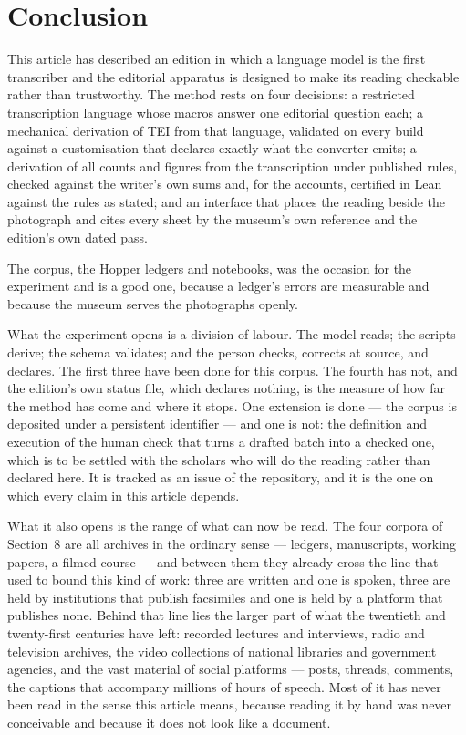 \documentclass[11pt]{article}
\begin{document}
\section{Conclusion}

This article has described an edition in which a language model is the first transcriber and the editorial apparatus is designed to make its reading checkable rather than trustworthy. The method rests on four decisions: a restricted transcription language whose macros answer one editorial question each; a mechanical derivation of TEI from that language, validated on every build against a customisation that declares exactly what the converter emits; a derivation of all counts and figures from the transcription under published rules, checked against the writer's own sums and, for the accounts, certified in Lean against the rules as stated; and an interface that places the reading beside the photograph and cites every sheet by the museum's own reference and the edition's own dated pass.

The corpus, the Hopper ledgers and notebooks, was the occasion for the experiment and is a good one, because a ledger's errors are measurable and because the museum serves the photographs openly.

What the experiment opens is a division of labour. The model reads; the scripts derive; the schema validates; and the person checks, corrects at source, and declares. The first three have been done for this corpus. The fourth has not, and the edition's own status file, which declares nothing, is the measure of how far the method has come and where it stops. One extension is done — the corpus is deposited under a persistent identifier — and one is not: the definition and execution of the human check that turns a drafted batch into a checked one, which is to be settled with the scholars who will do the reading rather than declared here. It is tracked as an issue of the repository, and it is the one on which every claim in this article depends.

What it also opens is the range of what can now be read. The four corpora of
Section~8 are all archives in the ordinary sense --- ledgers, manuscripts,
working papers, a filmed course --- and between them they already cross the
line that used to bound this kind of work: three are written and one is spoken,
three are held by institutions that publish facsimiles and one is held by a
platform that publishes none. Behind that line lies the larger part of what the
twentieth and twenty-first centuries have left: recorded lectures and
interviews, radio and television archives, the video collections of national
libraries and government agencies, and the vast material of social platforms
--- posts, threads, comments, the captions that accompany millions of hours of
speech. Most of it has never been read in the sense this article means, because
reading it by hand was never conceivable and because it does not look like a
document.
\end{document}
